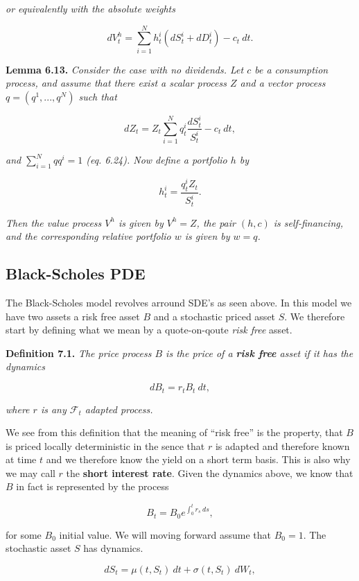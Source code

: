 \documentclass[
]{article}
\begin{document}
\emph{or equivalently with the absolute weights}

\[
dV_t^h=\sum_{i=1}^N h_t^i(dS_t^i+dD_t^i)-c_t\ dt.
\]

\textbf{Lemma 6.13.} \emph{Consider the case with no dividends. Let
\(c\) be a consumption process, and assume that there exist a scalar
process \(Z\) and a vector process \(q=(q^1,...,q^N)\) such that}

\[
dZ_t=Z_t\sum_{i=1}^N q_t^i\frac{dS_t^i}{S_t^i}-c_t\ dt,\tag{6.23}
\]

\emph{and \(\sum_{i=1}^Nqq^i=1\) (eq. 6.24). Now define a portfolio
\(h\) by}

\[
h_t^i=\frac{q_t^iZ_t}{S_t^i}.\tag{6.25}
\]

\emph{Then the value process \(V^h\) is given by \(V^h=Z\), the pair
\((h,c)\) is self-financing, and the corresponding relative portfolio
\(w\) is given by \(w=q\).}

\hypertarget{black-scholes-pde}{%
\subsection{Black-Scholes PDE}\label{black-scholes-pde}}

The Black-Scholes model revolves arround SDE's as seen above. In this
model we have two assets a risk free asset \(B\) and a stochastic priced
asset \(S\). We therefore start by defining what we mean by a
quote-on-qoute \emph{risk free} asset.

\textbf{Definition 7.1.} \emph{The price process \(B\) is the price of a
\textbf{risk free} asset if it has the dynamics}

\[
dB_t=r_t B_t\ dt,\tag{7.1}
\]

\emph{where \(r\) is any \(\mathcal{F}_t\) adapted process.}

We see from this definition that the meaning of ``risk free'' is the
property, that \(B\) is priced locally deterministic in the sence that
\(r\) is adapted and therefore known at time \(t\) and we therefore know
the yield on a short term basis. This is also why we may call \(r\) the
\textbf{short interest rate}. Given the dynamics above, we know that
\(B\) in fact is represented by the process

\[
B_t=B_0e^{\int_0^tr_s\ ds},
\]

for some \(B_0\) initial value. We will moving forward assume that
\(B_0=1\). The stochastic asset \(S\) has dynamics.

\[
dS_t=\mu(t,S_t)\ dt + \sigma(t,S_t)\ dW_t,\tag{7.2}
\]
\end{document}
